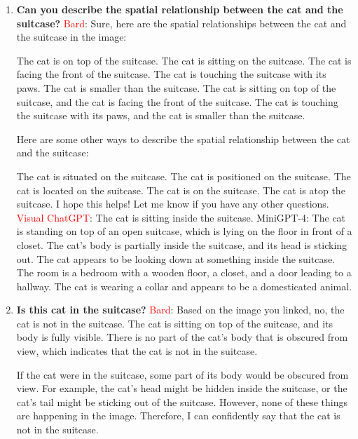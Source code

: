     \begin{enumerate}
        \item \textbf{Can you describe the spatial relationship between the cat and the suitcase?}
        \subitem \textcolor{Red}{Bard}: 
        Sure, here are the spatial relationships between the cat and the suitcase in the image:
        
        The cat is on top of the suitcase.
        The cat is sitting on the suitcase.
        The cat is facing the front of the suitcase.
        The cat is touching the suitcase with its paws.
        The cat is smaller than the suitcase.
        The cat is sitting on top of the suitcase, and the cat is facing the front of the suitcase. The cat is touching the suitcase with its paws, and the cat is smaller than the suitcase.
        
        Here are some other ways to describe the spatial relationship between the cat and the suitcase:
        
        The cat is situated on the suitcase.
        The cat is positioned on the suitcase.
        The cat is located on the suitcase.
        The cat is on the suitcase.
        The cat is atop the suitcase.
        I hope this helps! Let me know if you have any other questions.
        \subitem \textcolor{red}{Visual ChatGPT}: The cat is sitting inside the suitcase.
        \subitem MiniGPT-4: The cat is standing on top of an open suitcase, which is lying on the floor in front of a closet. The cat’s body is partially inside the suitcase, and its head is sticking out. The cat appears to be looking down at something inside the suitcase. The room is a bedroom with a wooden floor, a closet, and a door leading to a hallway. The cat is wearing a collar and appears to be a domesticated animal.
        \item \textbf{Is this cat in the suitcase?}
        \subitem \textcolor{Red}{Bard}: 
        Based on the image you linked, no, the cat is not in the suitcase. The cat is sitting on top of the suitcase, and its body is fully visible. There is no part of the cat's body that is obscured from view, which indicates that the cat is not in the suitcase.
        
        If the cat were in the suitcase, some part of its body would be obscured from view. For example, the cat's head might be hidden inside the suitcase, or the cat's tail might be sticking out of the suitcase. However, none of these things are happening in the image. Therefore, I can confidently say that the cat is not in the suitcase.
        

\end{enumerate}
